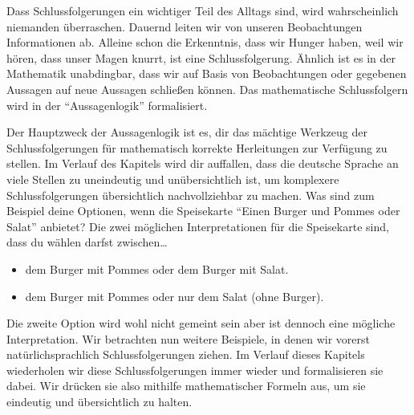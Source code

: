 \documentclass[../../main.tex]{subfiles}
\begin{document}
    Dass Schlussfolgerungen ein wichtiger Teil des Alltags sind, wird wahrscheinlich niemanden überraschen. Dauernd leiten wir von unseren Beobachtungen Informationen ab. Alleine schon die Erkenntnis, dass wir Hunger haben, weil wir hören, dass unser Magen knurrt, ist eine Schlussfolgerung. Ähnlich ist es in der Mathematik unabdingbar, dass wir auf Basis von Beobachtungen oder gegebenen Aussagen auf neue Aussagen schließen können. Das mathematische Schlussfolgern wird in der \enquote{Aussagenlogik} formalisiert.
    
    Der Hauptzweck der Aussagenlogik ist es, dir das mächtige Werkzeug der Schlussfolgerungen für mathematisch korrekte Herleitungen zur Verfügung zu stellen. Im Verlauf des Kapitels wird dir auffallen, dass die deutsche Sprache an viele Stellen zu uneindeutig und unübersichtlich ist, um komplexere Schlussfolgerungen übersichtlich nachvollziehbar zu machen. Was sind zum Beispiel deine Optionen, wenn die Speisekarte \enquote{Einen Burger und Pommes oder Salat} anbietet? Die zwei möglichen Interpretationen für die Speisekarte sind, dass du wählen darfst zwischen\dots
    \begin{itemize}[label=\dots, nosep]
        \item dem Burger mit Pommes oder dem Burger mit Salat.
        \item dem Burger mit Pommes oder nur dem Salat (ohne Burger).
    \end{itemize}
    Die zweite Option wird wohl nicht gemeint sein aber ist dennoch eine mögliche Interpretation. Wir betrachten nun weitere Beispiele, in denen wir vorerst natürlichsprachlich Schlussfolgerungen ziehen. Im Verlauf dieses Kapitels wiederholen wir diese Schlussfolgerungen immer wieder und formalisieren sie dabei. Wir drücken sie also mithilfe mathematischer Formeln aus, um sie eindeutig und übersichtlich zu halten.
    
    
    
\end{document}
